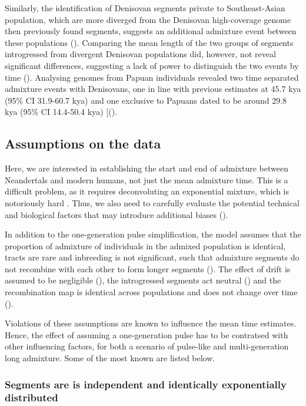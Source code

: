 \documentclass[]{article}
\begin{document}
Similarly, the identification of Denisovan segments private to
Southeast-Asian population, which are more diverged from the Denisovan
high-coverage genome then previously found segments, suggests an
additional admixture event between these populations
(\cite{browning_analysis_2018}). Comparing the mean length of the two groups of segments introgressed
from divergent Denisovan populations did, however, not reveal
significant differences, suggesting a lack of power to distinguish the
two events by time (\cite{browning_analysis_2018,jacobs_multiple_2019}).
Analysing genomes from Papuan individuals revealed two time separated
admixture events with Denisovans, one in line with previous estimates at
45.7 kya (95\% CI 31.9-60.7 kya) and one exclusive to Papuans dated to
be around 29.8 kya (95\% CI 14.4-50.4 kya)
{[}(\cite{jacobs_multiple_2019}).

\subsection{Assumptions on the data}\label{assumptions-on-the-data}
Here, we are interested in establishing the start and end of admixture between Neandertals and modern humans, not just the mean admixture time. This is a difficult problem, as it requires deconvoluting an exponential mixture, which is notoriously hard . Thus, we also need to carefully evaluate the potential technical and biological factors that may introduce additional biases (\cite{pool_inference_2009,gravel_population_2012,liang_lengths_2014}).

In addition to the one-generation pulse simplification, the model assumes
that the proportion of admixture of individuals in the admixed
population is identical, tracts are rare and inbreeding is not
significant, such that admixture segments do not recombine with each
other to form longer segments (\cite{pool_inference_2009}). The effect
of drift is assumed to be negligible (\cite{loh_inferring_2013}), the
introgressed segments act neutral (\cite{shchur_distribution_2019}) and
the recombination map is identical across populations and does not
change over time (\cite{gravel_population_2012}).

Violations of these assumptions are known to influence the mean time
estimates. Hence, the effect of assuming a one-generation pulse has to
be contratsed with other influencing factors, for both a scenario of
pulse-like and multi-generation long admixture. Some of the most known
are listed below.

\subsubsection{Segments are is independent and identically exponentially
distributed}\label{segments-are-is-independent-and-identically-exponentially-distributed}
\end{document}
